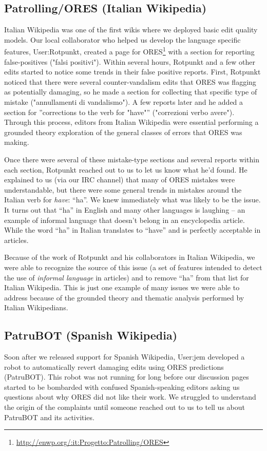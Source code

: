 \subsection{Patrolling/ORES (Italian Wikipedia)}
Italian Wikipedia was one of the first wikis where we deployed basic edit quality models.  Our local collaborator who helped us develop the language specific features, User:Rotpunkt, created a page for ORES\footnote{\url{http://enwp.org/:it:Progetto:Patrolling/ORES}} with a section for reporting false-positives ("falsi positivi").  Within several hours, Rotpunkt and a few other edits started to notice some trends in their false positive reports.  First, Rotpunkt noticed that there were several counter-vandalism edits that ORES was flagging as potentially damaging, so he made a section for collecting that specific type of mistake ("annullamenti di vandalismo").  A few reports later and he added a section for ''corrections to the verb for "have"'' ("correzioni verbo avere").  Through this process, editors from Italian Wikipedia were essential performing a grounded theory exploration of the general classes of errors that ORES was making.

Once there were several of these mistake-type sections and several reports within each section, Rotpunkt reached out to us to let us know what he'd found.  He explained to us (via our IRC channel) that many of ORES mistakes were understandable, but there were some general trends in mistakes around the Italian verb for \emph{have}: ``ha''.  We knew immediately what was likely to be the issue.  It turns out that ``ha'' in English and many other languages is laughing -- an example of informal language that doesn't belong in an encyclopedia article.  While the word ``ha'' in Italian translates to ``have'' and is perfectly acceptable in articles.

Because of the work of Rotpunkt and his collaborators in Italian Wikipedia, we were able to recognize the source of this issue (a set of features intended to detect the use of \emph{informal language} in articles) and to remove ``ha'' from that list for Italian Wikipedia.  This is just one example of many issues we were able to address because of the grounded theory and thematic analysis performed by Italian Wikipedians.

\subsection{PatruBOT (Spanish Wikipedia)}
Soon after we released support for Spanish Wikipedia, User:jem developed a robot to automatically revert damaging edits using ORES predictions (PatruBOT).  This robot was not running for long before our discussion pages started to be bombarded with confused Spanish-speaking editors asking us questions about why ORES did not like their work.  We struggled to understand the origin of the complaints until someone reached out to us to tell us about PatruBOT and its activities.

